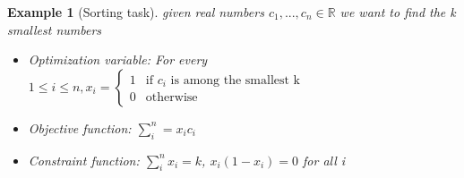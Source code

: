\documentclass[11pt]{article}
\newtheorem{example}[theorem]{Example}
\begin{document}
\begin{example}[Sorting task] given real numbers $c_1, ..., c_n \in \mathbb{R}$ we want to find the k smallest numbers
\begin{itemize}
    \item Optimization variable: For every $1 \leq i \leq n, x_i = \begin{cases}
        1 & \text{if $c_i$ is among the smallest k} \\
        0 & \text{otherwise}
    \end{cases}$ 
    \item Objective function: $\sum_i^n = x_i c_i$
    \item Constraint function: $\sum_i^n x_i = k$, $x_i(1-x_i) = 0$ for all i  
    
\end{itemize} 
    
\end{example}
\end{document}
